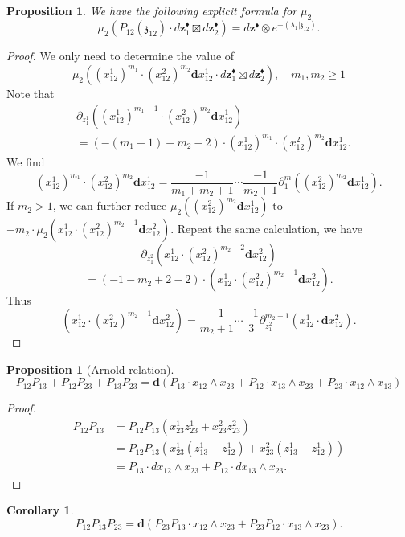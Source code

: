 \documentclass[11pt]{amsart}
\newtheorem{cor}[thm]{Corollary}
\newtheorem{prop}[thm]{Proposition}
\theoremstyle{definition}
\theoremstyle{remark}
\numberwithin{equation}{section}
\begin{document}
\begin{prop}
We have the following explicit formula for $\mu_2$
$$
\mu_2\left(P_{12}(\mathfrak{z}_{12})\cdot  
  d \mathbf{z}_{1}^{\blacklozenge} \boxtimes d \mathbf{z}^{\blacklozenge}_{2}
  \right)
=d\mathbf{z}^{\blacklozenge}\otimes e^{-(\lambda_1|\mathfrak{z}_{12})}.
$$
\end{prop}
\begin{proof}
We only need to determine the value of 
$$
\mu_2\left((x^1_{12})^{m_1}\cdot (x^2_{12})^{m_2}\mathbf{d}x^1_{12}\cdot  
  d \mathbf{z}_{1}^{\blacklozenge} \boxtimes d \mathbf{z}^{\blacklozenge}_{2}
\right),\quad m_1,m_2\geq 1
$$
Note that
\begin{align*}
&\partial_{z^1_1}\left((x^1_{12})^{m_1-1}\cdot (x^2_{12})^{m_2}\mathbf{d}x^1_{12}\right)\\
&=\left(-(m_1-1)-m_2-2\right)\cdot (x^1_{12})^{m_1}\cdot (x^2_{12})^{m_2}\mathbf{d}x^1_{12}.
\end{align*}
We find
$$
(x^1_{12})^{m_1}\cdot (x^2_{12})^{m_2}\mathbf{d}x^1_{12}=\frac{-1}{m_1+m_2+1}\cdots\frac{-1}{m_2+1}\partial^m_1\left((x^2_{12})^{m_2}\mathbf{d}x^1_{12}\right).
$$
If $m_2>1$, we can further reduce $\mu_2\left((x^2_{12})^{m_2}\mathbf{d}x^1_{12}\right)$ to $-m_2\cdot\mu_2\left(x^1_{12}\cdot(x^2_{12})^{m_2-1}\mathbf{d}x^2_{12}\right)$. Repeat the same calculation, we have
$$
\partial_{z^2_{1}}\left(x^1_{12}\cdot (x^2_{12})^{m_2-2}\mathbf{d}x^2_{12}\right)
$$
$$
=(-1-m_2+2-2)\cdot \left(x^1_{12}\cdot (x^2_{12})^{m_2-1}\mathbf{d}x^2_{12}\right).
$$
Thus 
$$
\left(x^1_{12}\cdot (x^2_{12})^{m_2-1}\mathbf{d}x^2_{12}\right)=\frac{-1}{m_2+1}\cdots \frac{-1}{3}\partial^{m_2-1}_{z^2_1} \left(x^1_{12}\cdot \mathbf{d}x^2_{12}\right).
$$
\end{proof}

\begin{prop}[Arnold relation]
  $$
  P_{12}P_{13}+P_{12}P_{23}+P_{13}P_{23}=\mathbf{d}\left(P_{13}\cdot x_{12}\wedge x_{23}+P_{12}\cdot x_{13}\wedge x_{23}+P_{23}\cdot x_{12}\wedge x_{13}\right)
  $$
\end{prop}
\begin{proof}
  \begin{align*}
   P_{12}P_{13}  &=P_{12}P_{13}(x^1_{23}z^1_{23}+x^2_{23}z^2_{23})  \\
     & =P_{12}P_{13}\left(x^1_{23}(z^1_{13}-z^1_{12})+x^2_{23}(z^1_{13}-z^1_{12})\right)\\
     &=P_{13}\cdot dx_{12}\wedge x_{23}+P_{12}\cdot dx_{13}\wedge x_{23}.
  \end{align*}
\end{proof}
\begin{cor}\label{RecursiveLemma}
  $$
  P_{12}P_{13}P_{23}=\mathbf{d}\left(P_{23}P_{13}\cdot x_{12}\wedge x_{23}+P_{23}P_{12}\cdot x_{13}\wedge x_{23}\right).
  $$
\end{cor}
\end{document}
